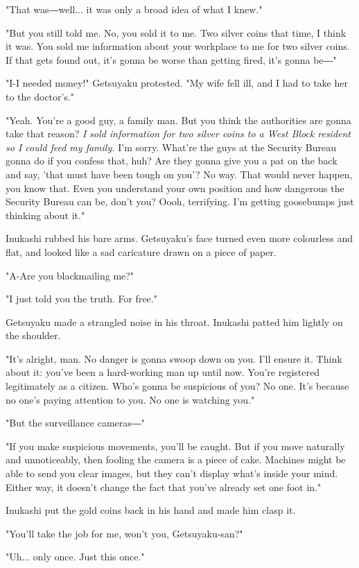 "That was―well... it was only a broad idea of what I knew."

"But you still told me. No, you sold it to me. Two silver coins that
time, I think it was. You sold me information about your workplace to me
for two silver coins. If that gets found out, it's gonna be worse than
getting fired, it's gonna be―"

"I-I needed money!" Getsuyaku protested. "My wife fell ill, and I had to
take her to the doctor's."

"Yeah. You're a good guy, a family man. But you think the authorities
are gonna take that reason? \emph{I sold information for two silver coins to a
West Block resident so I could feed my family.} I'm sorry. What're the
guys at the Security Bureau gonna do if you confess that, huh? Are they
gonna give you a pat on the back and say, 'that must have been tough on
you'? No way. That would never happen, you know that. Even you
understand your own position and how dangerous the Security Bureau can
be, don't you? Oooh, terrifying. I'm getting goosebumps just thinking
about it."

Inukashi rubbed his bare arms. Getsuyaku's face turned even more
colourless and flat, and looked like a sad caricature drawn on a piece
of paper.

"A-Are you blackmailing me?"

"I just told you the truth. For free."

Getsuyaku made a strangled noise in his throat. Inukashi patted him
lightly on the shoulder.

"It's alright, man. No danger is gonna swoop down on you. I'll ensure
it. Think about it: you've been a hard-working man up until now. You're
registered legitimately as a citizen. Who's gonna be suspicious of you?
No one. It's because no one's paying attention to you. No one is
watching you."

"But the surveillance cameras―"

"If you make suspicious movements, you'll be caught. But if you move
naturally and unnoticeably, then fooling the camera is a piece of cake.
Machines might be able to send you clear images, but they can't display
what's inside your mind. Either way, it doesn't change the fact that
you've already set one foot in."

Inukashi put the gold coins back in his hand and made him clasp it.

"You'll take the job for me, won't you, Getsuyaku-san?"

"Uh... only once. Just this once."

